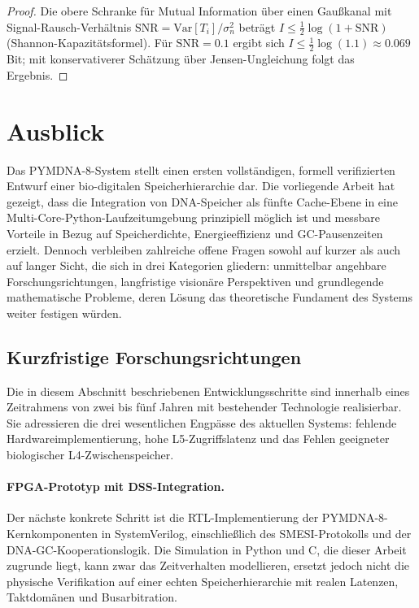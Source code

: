 ﻿\documentclass[a4paper,12pt]{article}
\theoremstyle{definition}
\begin{document}
\begin{proof}
  Die obere Schranke für Mutual Information über einen Gaußkanal mit
  Signal-Rausch-Verhältnis $\mathrm{SNR} = \mathrm{Var}[T_i] / \sigma_n^2$
  beträgt $I \le \frac{1}{2}\log(1 + \mathrm{SNR})$ (Shannon-Kapazitätsfor\-mel).
  Für $\mathrm{SNR} = 0.1$ ergibt sich $I \le \frac{1}{2}\log(1.1) \approx 0.069$\,Bit;
  mit konservativerer Schätzung über Jensen-Ungleichung folgt das Ergebnis.
\end{proof}

\section{Ausblick}

Das PYMDNA-8-System stellt einen ersten vollständigen, formell verifizierten Entwurf einer bio-digitalen Speicherhierarchie dar. Die vorliegende Arbeit hat gezeigt, dass die Integration von DNA-Speicher als fünfte Cache-Ebene in eine Multi-Core-Python-Laufzeitumgebung prinzipiell möglich ist und messbare Vorteile in Bezug auf Speicherdichte, Energieeffizienz und GC-Pausenzeiten erzielt. Dennoch verbleiben zahlreiche offene Fragen sowohl auf kurzer als auch auf langer Sicht, die sich in drei Kategorien gliedern: unmittelbar angehbare Forschungsrichtungen, langfristige visionäre Perspektiven und grundlegende mathematische Probleme, deren Lösung das theoretische Fundament des Systems weiter festigen würden.

\subsection{Kurzfristige Forschungsrichtungen}

Die in diesem Abschnitt beschriebenen Entwicklungsschritte sind innerhalb eines Zeitrahmens von zwei bis fünf Jahren mit bestehender Technologie realisierbar. Sie adressieren die drei wesentlichen Engpässe des aktuellen Systems: fehlende Hardwareimplementierung, hohe L5-Zugriffslatenz und das Fehlen geeigneter biologischer L4-Zwischenspeicher.

\paragraph{FPGA-Prototyp mit DSS-Integration.}
Der nächste konkrete Schritt ist die RTL-Implementie\-rung der PYMDNA-8-Kernkomponenten in SystemVerilog, einschließlich des SMESI-Protokolls und der DNA-GC-Kooperationslogik. Die Simulation in Python und C, die dieser Arbeit zugrunde liegt, kann zwar das Zeitverhalten modellieren, ersetzt jedoch nicht die physische Verifikation auf einer echten Speicherhierarchie mit realen Latenzen, Taktdomänen und Busarbitration.
\end{document}
